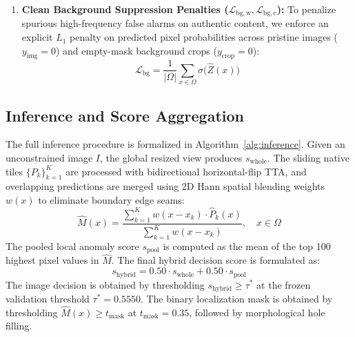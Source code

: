 \begin{enumerate}
\begin{equation}
    \end{equation}
    \item \textbf{Clean Background Suppression Penalties ($\mathcal{L}_{\mathrm{bg,w}}, \mathcal{L}_{\mathrm{bg,c}}$):} To penalize spurious high-frequency false alarms on authentic content, we enforce an explicit $L_1$ penalty on predicted pixel probabilities across pristine images ($y_{\mathrm{img}} = 0$) and empty-mask background crops ($y_{\mathrm{crop}} = 0$):
    \begin{equation}
        \mathcal{L}_{\mathrm{bg}} = \frac{1}{|\Omega|} \sum_{x \in \Omega} \sigma\big(\hat{Z}(x)\big)
    \end{equation}
\end{enumerate}

\subsection{Inference and Score Aggregation}
The full inference procedure is formalized in Algorithm~\ref{alg:inference}. Given an unconstrained image $I$, the global resized view produces $s_{\mathrm{whole}}$. The sliding native tiles $\{P_k\}_{k=1}^K$ are processed with bidirectional horizontal-flip TTA, and overlapping predictions are merged using 2D Hann spatial blending weights $w(x)$ to eliminate boundary edge seams:
\begin{equation}
    \hat{M}(x) = \frac{\sum_{k=1}^K w(x - x_k) \cdot \hat{P}_k(x)}{\sum_{k=1}^K w(x - x_k)}, \quad x \in \Omega
    \label{eq:hann_blend}
\end{equation}
The pooled local anomaly score $s_{\mathrm{pool}}$ is computed as the mean of the top 100 highest pixel values in $\hat{M}$. The final hybrid decision score is formulated as:
\begin{equation}
    s_{\mathrm{hybrid}} = 0.50 \cdot s_{\mathrm{whole}} + 0.50 \cdot s_{\mathrm{pool}}
    \label{eq:hybrid_score}
\end{equation}
The image decision is obtained by thresholding $s_{\mathrm{hybrid}} \ge \tau^*$ at the frozen validation threshold $\tau^* = 0.5550$. The binary localization mask is obtained by thresholding $\hat{M}(x) \ge t_{\mathrm{mask}}$ at $t_{\mathrm{mask}} = 0.35$, followed by morphological hole filling.

